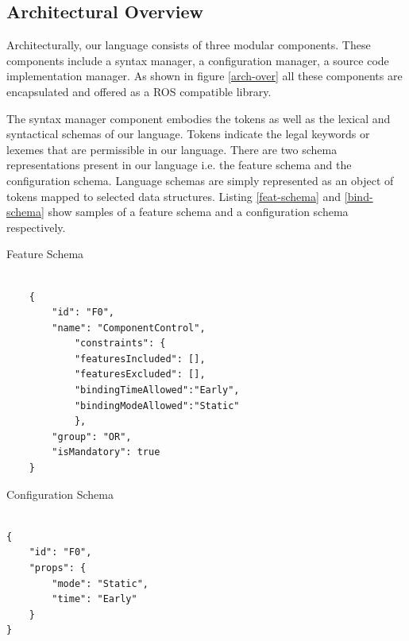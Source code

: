 \documentclass[conference]{IEEEtran}
\begin{document}
\subsection{Architectural Overview}
Architecturally, our language consists of three modular components. These components include a syntax manager, a configuration manager, a source code implementation manager. As shown in figure \ref{arch-over} all these components are encapsulated and offered as a ROS compatible library.

The syntax manager component embodies the tokens as well as the lexical and syntactical schemas of our language. Tokens indicate the legal keywords or lexemes that are permissible in our language. There are two schema representations present in our language i.e. the feature schema and the configuration schema. Language schemas are simply represented as an object of tokens mapped to selected data structures. Listing \ref{feat-schema} and \ref{bind-schema} show samples of a feature schema and a configuration schema respectively.

\begin{listing}
\caption{Feature Schema}
\begin{verbatim}

    {
        "id": "F0",
        "name": "ComponentControl",
            "constraints": {
            "featuresIncluded": [],
            "featuresExcluded": [],
            "bindingTimeAllowed":"Early",
            "bindingModeAllowed":"Static"
            },
        "group": "OR",
        "isMandatory": true
    }

\end{verbatim}
\label{feat-schema}
\end{listing}

\begin{listing}
\caption{Configuration Schema}
\begin{verbatim}

{
    "id": "F0",
    "props": {
        "mode": "Static",
        "time": "Early"
    }
}
\end{verbatim}
\label{bind-schema}
\end{listing}
\end{document}

